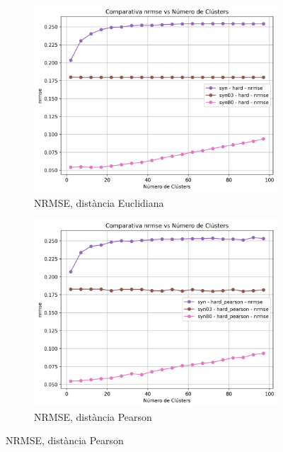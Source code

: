 \documentclass[a4paper,12pt]{report}
\begin{document}
\begin{figure}[H]
    \vspace{1em}

    \begin{subfigure}[b]{0.49\textwidth}
        \includegraphics[width=\textwidth]{Figuras/nrmse-hard-sin.png}
        \caption{NRMSE, distància Euclidiana}
        \label{fig:hard-clustering-sin-results-c}
    \end{subfigure}
    \hfill
    \begin{subfigure}[b]{0.49\textwidth}
        \includegraphics[width=\textwidth]{Figuras/nrmse-hard_pearson-sin.png}
        \caption{NRMSE, distància Pearson}
        \label{fig:hard-clustering-sin-results-d}
    \end{subfigure}


\end{figure}
\end{document}
